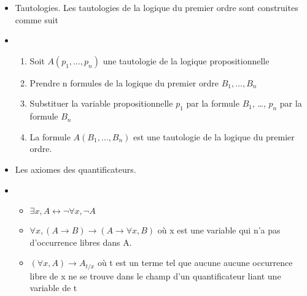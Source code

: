 \begin{itemize}
  \item Tautologies. Les tautologies de la logique du premier ordre
        sont construites comme suit
  \item[] \begin{enumerate}
      \item
            Soit $A(p_1, \dots , p_n)$ une tautologie de la logique propositionnelle
      \item Prendre n formules de la logique du premier ordre $B_1, \dots , B_n$
      \item Substituer la variable propositionnelle $p_1$ par la formule $B_1$, \dots, $p_n$ par la formule $B_n$
      \item La formule $A(B_1, \dots , B_n)$ est une tautologie de la logique du premier ordre.
    \end{enumerate}
  \item Les axiomes des quantificateurs.
  \item[] \begin{itemize}
      \item $\exists x, A \leftrightarrow \neg \forall x, \neg A$
      \item $\forall x,(A \rightarrow B) \rightarrow (A \rightarrow \forall x, B)$ où x est une variable qui n’a pas d’occurrence libres dans A.
      \item $(\forall x, A) \rightarrow A_{t / x}$ où t est un terme tel que aucune aucune occurrence libre de x ne se trouve dans le champ d'un quantificateur liant une variable de t
    \end{itemize}
\end{itemize}
\newpage
